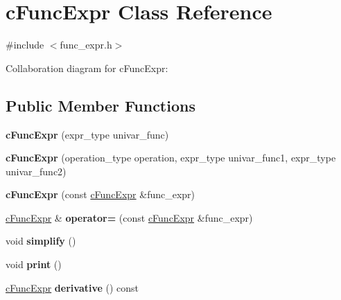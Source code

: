 \hypertarget{classcFuncExpr}{\section{c\-Func\-Expr Class Reference}
\label{classcFuncExpr}
}


{\ttfamily \#include $<$func\-\_\-expr.\-h$>$}



Collaboration diagram for c\-Func\-Expr\-:
\subsection*{Public Member Functions}
\begin{DoxyCompactItemize}
\item 
\hypertarget{classcFuncExpr_a71288f1b0941126d468680a2a65fcab7}{{\bfseries c\-Func\-Expr} (expr\-\_\-type univar\-\_\-func)}\label{classcFuncExpr_a71288f1b0941126d468680a2a65fcab7}

\item 
\hypertarget{classcFuncExpr_a7843efed00c4ad1d5c63a9a67f735b6c}{{\bfseries c\-Func\-Expr} (operation\-\_\-type operation, expr\-\_\-type univar\-\_\-func1, expr\-\_\-type univar\-\_\-func2)}\label{classcFuncExpr_a7843efed00c4ad1d5c63a9a67f735b6c}

\item 
\hypertarget{classcFuncExpr_ad66bab49b10724c06c928c7f44c1c2e4}{{\bfseries c\-Func\-Expr} (const \hyperlink{classcFuncExpr}{c\-Func\-Expr} \&func\-\_\-expr)}\label{classcFuncExpr_ad66bab49b10724c06c928c7f44c1c2e4}

\item 
\hypertarget{classcFuncExpr_a16da4fe524fb54c6b303cd1c1249b80f}{\hyperlink{classcFuncExpr}{c\-Func\-Expr} \& {\bfseries operator=} (const \hyperlink{classcFuncExpr}{c\-Func\-Expr} \&func\-\_\-expr)}\label{classcFuncExpr_a16da4fe524fb54c6b303cd1c1249b80f}

\item 
\hypertarget{classcFuncExpr_a1e4d0890110908c3cfe17f390016074b}{void {\bfseries simplify} ()}\label{classcFuncExpr_a1e4d0890110908c3cfe17f390016074b}

\item 
\hypertarget{classcFuncExpr_a251f5ca06f0a3928c1b09b1f12903ba5}{void {\bfseries print} ()}\label{classcFuncExpr_a251f5ca06f0a3928c1b09b1f12903ba5}

\item 
\hypertarget{classcFuncExpr_a7c783da6cbbff4ab740d830a4b14cfd6}{\hyperlink{classcFuncExpr}{c\-Func\-Expr} {\bfseries derivative} () const }\label{classcFuncExpr_a7c783da6cbbff4ab740d830a4b14cfd6}


\end{DoxyCompactItemize}
